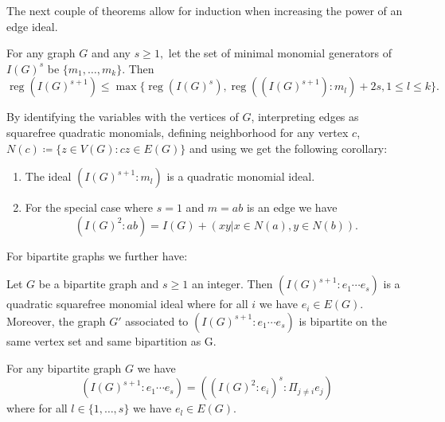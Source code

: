 \documentclass[ALCO,published]{cedram}
\numberwithin{equation}{section}
\newcommand \reg{\operatorname{reg}}
\begin{document}
 The next couple of theorems allow for induction when increasing the power of an edge ideal.
 
\begin{theorem}
\label{thm:2.3}
For any graph $G$ and any $s \geq 1,$ let the set of minimal monomial generators of $I(G)^s$ be $\{m_1, \dots, m_k\}.$ Then
$$ \reg (I(G)^{s+1}) \leq \max \{\reg (I(G)^s) , \reg ((I(G)^{s+1}): m_l)+2s , 1 \leq l \leq k\}.$$
\end{theorem}

 By identifying the variables with the vertices of $G$, interpreting edges as squarefree quadratic monomials, defining neighborhood for any vertex $c$,  $N(c)\coloneqq\{z\in V(G): cz \in E(G)\}$ and using  \cite[Thm. 5.2]{banerjee}  we get the following corollary:

\begin{coro}
\begin{enumerate}[label=(\roman*)]
\item The ideal $(I(G)^{s+1}: m_l)$ is a quadratic monomial ideal.
\item For the special case where $s=1$ and $m=ab$ is an edge we have $$(I(G)^2:ab)=I(G)+(xy| x\in N(a),y\in N(b)).$$
\end{enumerate}
\label{cor:I2:e}
\end{coro}

 For bipartite graphs we further have:
\begin{theorem}
Let $G$ be a bipartite graph and $s \geq 1$ an integer. 
Then $(I(G)^{s+1}: e_1 \cdots e_s)$ is a quadratic squarefree monomial ideal where for all $i$ we have $e_i \in E(G)$. Moreover, the graph $G'$ associated to $(I(G)^{s+1} : e_1\cdots e_s)$ is bipartite on the same vertex set and same bipartition as G.

 For any bipartite graph $G$ we have $$(I(G)^{s+1}:e_1\cdots e_s)=((I(G)^2:e_i)^s : \Pi_{j \neq i} e_j)$$ where for all $l \in \{1, \ldots,s\}$ we have $e_l \in E(G)$.
 \label{thm:2.5}
\end{theorem}
\end{document}

